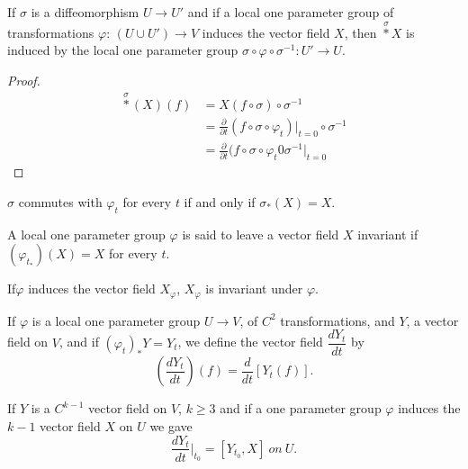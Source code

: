 \begin{proposition}\label{chap2:sec6:prop2} %
  If $\sigma$ is a diffeomorphism $U \to U'$ and if a local one
  parameter group of transformations $\varphi$: $(U \cup U' ) \to V$
  induces the vector field $X$, then $\overset{\sigma}{\ast} X$ is
  induced by the 
  local one parameter group $\sigma \circ \varphi \circ \sigma^{-1}: U' \to U$. 
\end{proposition}

\begin{proof}
  \begin{align*}
    \overset{\sigma}{\ast} (X)(f) & = X (f \circ \sigma) \circ \sigma^{-1} \\
    & = \frac{\partial}{\partial t} (f \circ \sigma \circ \varphi_t)|_{t = 0}
    \circ \sigma^{-1} \\ 
    & = \frac{\partial}{\partial t} (f \circ \sigma \circ \varphi_t 0
    \sigma^{-1} |_{t = 0}  
  \end{align*}
\end{proof}

\setcounter{corollary}{0}
\begin{corollary}\label{chap2:sec6:coro1} %
  $\sigma$ commutes with $\varphi_t$ for every $t$ if and only if
  $\sigma_* (X) = X$. 
\end{corollary}

\begin{defi*}
  A local one parameter group $\varphi$ is said to leave a vector
  field $X$ invariant if $(\varphi_{t_*}) (X) = X$ for every $t$. 
\end{defi*}

\begin{remark*}
  If\pageoriginale $\varphi$ induces the vector field $X_\varphi$, $X_\varphi$ is
  invariant under $\varphi$. 
\end{remark*}

\begin{defi*}
  If $\varphi$ is a local one parameter group $U \to V$, of $C^2$
  transformations, and $Y$, a vector field on $V$, and if
  $(\varphi_{t})_* Y = Y_t$, we define the vector field $\dfrac{d
      Y_t}{dt}$ by 
  $$
  \left(\frac{dY_t}{dt}\right) (f) = \frac{d}{dt} [Y_t (f)].
  $$
\end{defi*}

\begin{proposition}\label{chap2:sec6:prop3} %
  If $Y$ is a $C^{k-1}$ vector field on $V$, $k \geq 3$ and if a one
  parameter group $\varphi$ induces the $k-1$ vector field $X$ on $U$
  we gave 
  $$
  \frac{dY_t}{dt} \bigg|_{t_0} = [ Y_{t_0}, X]~ on ~ U.
  $$
\end{proposition}

